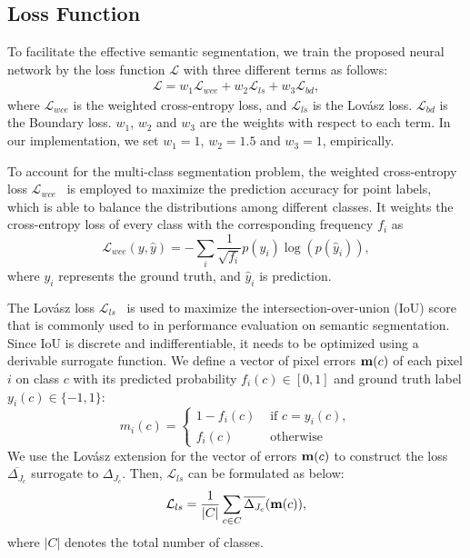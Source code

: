 \documentclass[letterpaper, 10 pt, journal, twoside]{ieeetran}
\begin{document}
\subsection{Loss Function}
To facilitate the effective semantic segmentation, we train the proposed neural network by the loss function $\mathcal{L}$ with three different terms as follows:
\begin{align}
    {\mathcal{L}}=w_1{\mathcal{L}}_{wce}+w_2{\mathcal{L}}_{ls}+ w_3{\mathcal{L}}_{bd},
\end{align}
where ${\mathcal{L}}_{wce}$ is the weighted cross-entropy loss, and ${\mathcal{L}}_{ls}$ is the Lov\'asz loss. ${\mathcal{L}}_{bd}$ is the Boundary loss. $w_1$, $w_2$ and $w_3$ are the weights with respect to each term. In our implementation, we set $w_1 = 1$, $w_2 = 1.5$ and $w_3 = 1$, empirically.


To account for the multi-class segmentation problem, the weighted cross-entropy loss ${\mathcal{L}}_{wce}$~\cite{zhang2018generalized} is employed to maximize the prediction accuracy for point labels, which is able to balance the distributions among different classes. It weights the cross-entropy loss of every class with the corresponding frequency $f_i$ as 
\begin{equation}
\mathcal{L}_{wce}(y, \hat{y})=-\sum_{i} \frac{1}{\sqrt{f_{i}}}  p\left(y_{i}\right) \log \left(p\left(\hat{y}_{i}\right)\right),
\end{equation}
where $y_i$ represents the ground truth, and $\hat{y}_i$ is prediction.

The Lov\'asz loss ${\mathcal{L}}_{ls}$~\cite{berman2018lovasz} is used to maximize the intersection-over-union (IoU) score that is commonly used to in performance evaluation on semantic segmentation. Since IoU is discrete and indifferentiable, it needs to be optimized using a derivable surrogate function. We define a vector of pixel errors $\bold{m}(c)$ of each pixel $i$ on class $c$ with its predicted probability $f_{i}(c) \in[0,1]$ and ground truth label $y_{i}(c) \in\{-1,1\}$:
\begin{equation}
m_{i}(c)= \begin{cases}1-f_{i}(c) & \text { if } c=y_{i}(c),  \\ f_{i}(c) & \text { otherwise }\end{cases}
\end{equation}
We use the Lov\'asz extension \cite{berman2018lovasz} for the vector of errors $\bold{m}(c)$ to construct the loss $\overline{\Delta_{J_{c}}}$ surrogate to $\Delta_{J_{c}}$. Then, ${\mathcal{L}}_{ls}$ can be formulated as below:
\begin{equation}
\mathcal{L}_{l s}=\frac{1}{|C|} \sum_{c \in C} \overline{\Delta_{J_{c}}}(\bold{m}(c)),
\end{equation}
where $|C|$ denotes the total number of classes. 
\end{document}
